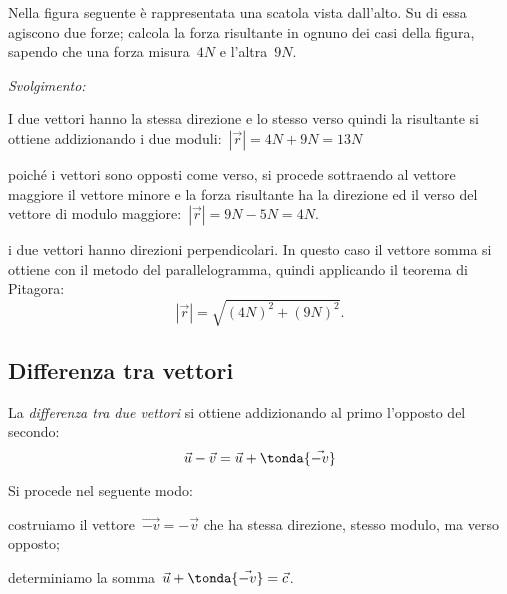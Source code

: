 \begin{esempio}
Nella figura seguente è rappresentata una scatola vista dall'alto. Su di essa 
agiscono due forze; calcola la forza risultante in ognuno dei casi della 
figura,
sapendo che una forza misura~\(4 \unit{N}\) e l'altra~\(9 \unit{N}\).
\begin{center}
 
\end{center}
\emph{Svolgimento:}
\begin{enumeratea}
\item I due vettori hanno la stessa direzione e lo stesso verso quindi la 
risultante si ottiene addizionando i due moduli:~\(|\vec{r}|=4 \unit{N}+9 
\unit{N}=13 \unit{N}\)
\item poiché i vettori sono opposti come verso, si procede sottraendo al 
vettore maggiore il vettore minore e la forza risultante ha la direzione ed 
il 
verso
del vettore di modulo maggiore:~\(|\vec{r}|=9 \unit{N} - 5 \unit{N}=4 
\unit{N}\).
\item i due vettori hanno direzioni perpendicolari. In questo caso il vettore 
somma si ottiene con il metodo del parallelogramma, quindi applicando il 
teorema di Pitagora:
\[|\vec{r}|=\sqrt{(4 \unit{N})^2+(9 \unit{N})^2}.\]
\end{enumeratea}
\end{esempio}

\subsection{Differenza tra vettori}

La \emph{differenza tra due vettori} si ottiene addizionando al primo 
l'opposto del secondo: 
\[\vec{u} - \vec{v} = \vec{u} + \tonda{\vec{-v}}\]

\begin{minipage}{.59 \textwidth}
Si procede nel seguente modo:
\begin{enumeratea}
\item costruiamo il vettore~\(\vec{-v}=-\vec{v}\) che ha stessa direzione, 
stesso modulo, ma verso opposto;
\item determiniamo la somma~\(\vec{u}+\tonda{\vec{-v}} = \vec{c}\).
\end{enumeratea}
\end{minipage}
\hfill
\begin{minipage}{.39 \textwidth}
\begin{inaccessibleblock}
 \begin{center}
  \scalebox{.8}{}
 \end{center}
\end{inaccessibleblock}
\end{minipage}

